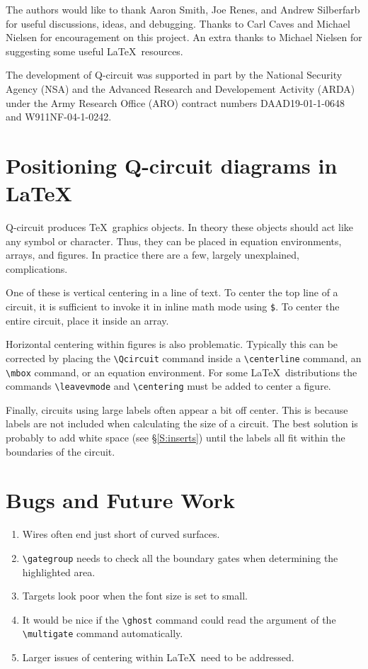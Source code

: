 \documentclass[twocolumn,nofootinbib]{revtex4}
\begin{document}
The authors would like to thank Aaron Smith, Joe Renes, and Andrew Silberfarb for useful discussions, ideas, and debugging.  Thanks to Carl Caves and Michael Nielsen for encouragement on this project.  An extra thanks to Michael Nielsen for suggesting some useful \LaTeX \ resources.

The development of Q-circuit was supported in part by the National Security Agency (NSA) and the Advanced Research and Developement Activity (ARDA) under the Army Research Office (ARO) contract numbers DAAD19-01-1-0648 and W911NF-04-1-0242.

\appendix
\section{Positioning Q-circuit diagrams in \LaTeX}
Q-circuit produces \TeX\ graphics objects.  In theory these objects should act like any symbol or character.  Thus, they can be placed in equation environments, arrays, and figures.  In practice there are a few, largely unexplained, complications.

One of these is vertical centering in a line of text.  To center the top line of a circuit, it is sufficient to invoke it in inline math mode using \verb=$=.  To center the entire circuit, place it inside an array.

Horizontal centering within figures is also problematic.  Typically this can be corrected by placing the \verb=\Qcircuit= command inside a \verb=\centerline= command, an \verb=\mbox= command, or an equation environment.  For some \LaTeX\ distributions the commands \verb=\leavevmode= and \verb=\centering= must be added to center a figure. 

Finally, circuits using large labels often appear a bit off center.  This is because labels are not included when calculating the size of a circuit.  The best solution is probably to add white space (see \S\ref{S:inserts}) until the labels all fit within the boundaries of the circuit.

\section{Bugs and Future Work}

\begin{enumerate}
\item Wires often end just short of curved surfaces.
\item \verb=\gategroup= needs to check all the boundary gates when determining the highlighted area.
\item Targets look poor when the font size is set to small.
\item It would be nice if the \verb=\ghost= command could read the argument of the \verb=\multigate= command automatically.
\item Larger issues of centering within \LaTeX\ need to be addressed.
\end{enumerate}
\end{document}
